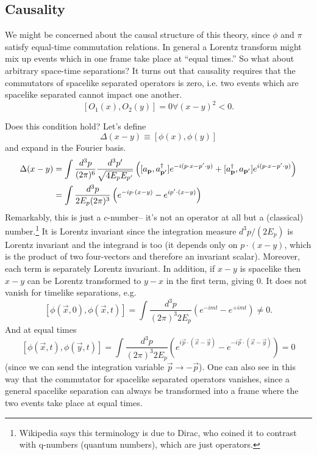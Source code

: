 \subsection*{Causality} We might be concerned about the causal structure of this theory, since $\phi$ and $\pi$ satisfy equal-time commutation relations. In general a Lorentz transform might mix up events which in one frame take place at ``equal times.'' So what about arbitrary space-time separations? It turns out that causality requires that the commutators of spacelike separated operators is zero, i.e. two events which are spacelike separated cannot impact one another.
$$[O_1(x),O_2(y)]=0 \forall (x-y)^2 <0.$$

Does this condition hold? Let's define
$$\Delta(x-y)\equiv [\phi(x),\phi(y)]$$
and expand in the Fourier basis.
\begin{align*}
\Delta(x-y) &= \int \frac{d^3p}{(2\pi)^6} \frac{d^3p'}{\sqrt{4E_p E_{p'}}} \left([a_{\boldsymbol{\mathbf{p}}},a_{\boldsymbol{\mathbf{p}}'}^\dagger] e^{-i(p\cdot x - p' \cdot y)}+[a_{\boldsymbol{\mathbf{p}}}^\dagger, a_{\boldsymbol{\mathbf{p}}'}] e^{i(p\cdot x-p' \cdot y)}\right)\\
&= \int \frac{d^3p}{2E_p(2\pi)^3}\left(e^{-ip\cdot (x-y)}-e^{i p' \cdot (x-y)}\right)
\end{align*}
Remarkably, this is just a $c$-number-- it's not an operator at all but a (classical) number.\footnote{Wikipedia says this terminology is due to Dirac, who coined it to contrast with q-numbers (quantum numbers), which are just operators.} It is Lorentz invariant since the integration measure $d^3p/(2E_p)$ is Lorentz invariant and the integrand is too (it depends only on $p\cdot (x-y)$, which is the product of two four-vectors and therefore an invariant scalar). Moreover, each term is separately Lorentz invariant. In addition, if $x-y$ is spacelike then $x-y$ can be Lorentz transformed to $y-x$ in the first term, giving $0$. It does not vanish for timelike separations, e.g.
$$[\phi (\vec x,0), \phi(\vec x,t)] = \int \frac{d^3p}{(2\pi)^3 2 E_p}(e^{-imt}-e^{+imt})\neq 0.$$
And at equal times 
$$[\phi(\vec x,t),\phi(\vec y, t)]=\int \frac{d^3p}{(2\pi)^3 2E_p}(e^{i\vec p \cdot (\vec x - \vec y)}- e^{-i \vec p \cdot (\vec x- \vec y)})=0$$
(since we can send the integration variable $\vec p\to -\vec p$). One can also see in this way that the commutator for spacelike separated operators vanishes, since a general spacelike separation can always be transformed into a frame where the two events take place at equal times.

